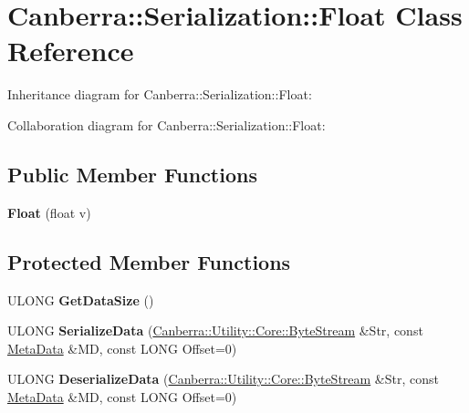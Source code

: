 \hypertarget{class_canberra_1_1_serialization_1_1_float}{}\section{Canberra\+:\+:Serialization\+:\+:Float Class Reference}
\label{class_canberra_1_1_serialization_1_1_float}


Inheritance diagram for Canberra\+:\+:Serialization\+:\+:Float\+:


Collaboration diagram for Canberra\+:\+:Serialization\+:\+:Float\+:
\subsection*{Public Member Functions}
\begin{DoxyCompactItemize}
\item 
\mbox{\label{class_canberra_1_1_serialization_1_1_float_a1c488d7b71c87791c8d57fa5f548ef20}} 
{\bfseries Float} (float v)
\end{DoxyCompactItemize}
\subsection*{Protected Member Functions}
\begin{DoxyCompactItemize}
\item 
\mbox{\label{class_canberra_1_1_serialization_1_1_float_a2111e04e6bc6fe183b9d568d451bb524}} 
U\+L\+O\+NG {\bfseries Get\+Data\+Size} ()
\item 
\mbox{\label{class_canberra_1_1_serialization_1_1_float_ab8f11255daed062938c1e6821a7a8e58}} 
U\+L\+O\+NG {\bfseries Serialize\+Data} (\hyperlink{class_canberra_1_1_utility_1_1_core_1_1_byte_stream}{Canberra\+::\+Utility\+::\+Core\+::\+Byte\+Stream} \&Str, const \hyperlink{class_canberra_1_1_serialization_1_1_meta_data}{Meta\+Data} \&MD, const L\+O\+NG Offset=0)
\item 
\mbox{\label{class_canberra_1_1_serialization_1_1_float_a2c716b3db8189c816ba82746057f994e}} 
U\+L\+O\+NG {\bfseries Deserialize\+Data} (\hyperlink{class_canberra_1_1_utility_1_1_core_1_1_byte_stream}{Canberra\+::\+Utility\+::\+Core\+::\+Byte\+Stream} \&Str, const \hyperlink{class_canberra_1_1_serialization_1_1_meta_data}{Meta\+Data} \&MD, const L\+O\+NG Offset=0)
\end{DoxyCompactItemize}
